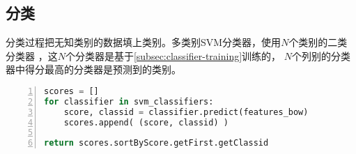 \subsection{分类}
\label{subsec:classifier-label}
分类过程把无知类别的数据填上类别。多类别SVM分类器，使用$N$个类别的二类分类器
，这$N$个分类器是基于\ref{subsec:classifier-training}训练的，
$N$个列别的分类器中得分最高的分类器是预测到的类别。
\begin{lstlisting}[language=Python,
                   basicstyle=\small,
                   numbers=left,
                   showstringspaces=false,
                   caption={SVM多类别分类器分类pseudocode},
                   label={lst:classifier-training}]
scores = []
for classifier in svm_classifiers:
    score, classid = classifier.predict(features_bow)
    scores.append( (score, classid) )

return scores.sortByScore.getFirst.getClassid
\end{lstlisting}




